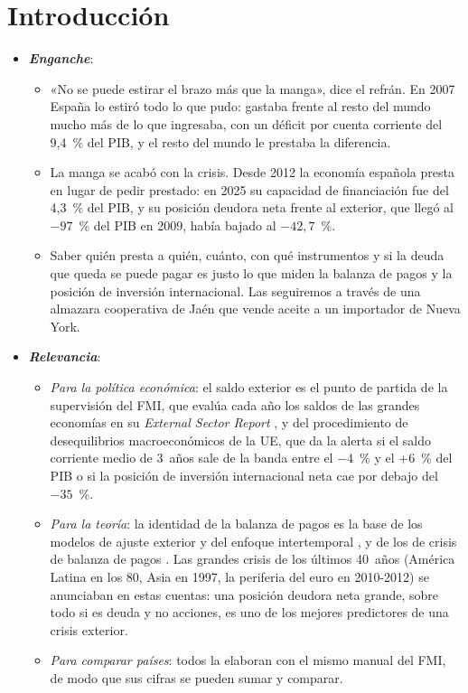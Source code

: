 \documentclass[11pt]{article}
\begin{document}
\tceetitulo

\section*{Introducción}

\begin{itemize}
\item \textbf{\emph{Enganche}}:
  \begin{itemize}
  \item «No se puede estirar el brazo más que la manga», dice el refrán. En 2007 España lo estiró todo lo que pudo: gastaba frente al resto del mundo mucho más de lo que ingresaba, con un déficit por cuenta corriente del 9,4~\% del PIB, y el resto del mundo le prestaba la diferencia\nocite{BdE2026BE17}.
  \item La manga se acabó con la crisis. Desde 2012 la economía española presta en lugar de pedir prestado: en 2025 su capacidad de financiación fue del 4,3~\% del PIB, y su posición deudora neta frente al exterior, que llegó al $-97$~\% del PIB en 2009, había bajado al $-42{,}7$~\%\nocite{BdE2026BE17,BdE2026BP2025}.
  \item Saber quién presta a quién, cuánto, con qué instrumentos y si la deuda que queda se puede pagar es justo lo que miden la balanza de pagos y la posición de inversión internacional. Las seguiremos a través de una almazara cooperativa de Jaén que vende aceite a un importador de Nueva York.
  \end{itemize}

\item \textbf{\emph{Relevancia}}:
  \begin{itemize}
  \item \emph{Para la política económica}: el saldo exterior es el punto de partida de la supervisión del FMI, que evalúa cada año los saldos de las grandes economías en su \emph{External Sector Report}\nocite{FMI2026ESR} , y del procedimiento de desequilibrios macroeconómicos de la UE, que da la alerta si el saldo corriente medio de 3~años sale de la banda entre el $-4$~\% y el $+6$~\% del PIB o si la posición de inversión internacional neta cae por debajo del $-35$~\%\nocite{CE2025AMR2026,Eurostat2025MIP}.
  \item \emph{Para la teoría}: la identidad de la balanza de pagos es la base de los modelos de ajuste exterior y del enfoque intertemporal , y de los de crisis de balanza de pagos . Las grandes crisis de los últimos 40~años (América Latina en los 80, Asia en 1997, la periferia del euro en 2010-2012) se anunciaban en estas cuentas: una posición deudora neta grande, sobre todo si es deuda y no acciones, es uno de los mejores predictores de una crisis exterior\nocite{CataoMilesiFerretti2014}.
  \item \emph{Para comparar países}: todos la elaboran con el mismo manual del FMI, de modo que sus cifras se pueden sumar y comparar.
  \end{itemize}


\end{itemize}
\end{document}
